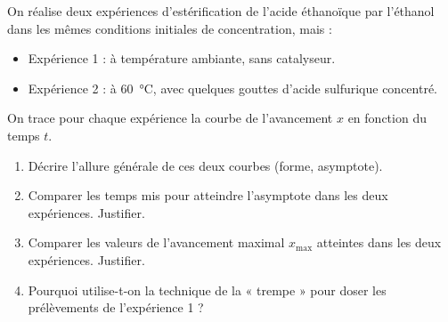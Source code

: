\documentclass[11pt]{article}
\begin{document}
\begin{exercice}
On réalise deux expériences d'estérification de l'acide éthanoïque par l'éthanol dans les mêmes conditions initiales de concentration, mais :
\begin{itemize}
    \item Expérience 1 : à température ambiante, sans catalyseur.
    \item Expérience 2 : à \SI{60}{\celsius}, avec quelques gouttes d'acide sulfurique concentré.
\end{itemize}
On trace pour chaque expérience la courbe de l'avancement $x$ en fonction du temps $t$.

\begin{enumerate}
    \item Décrire l'allure générale de ces deux courbes (forme, asymptote).
    \item Comparer les temps mis pour atteindre l'asymptote dans les deux expériences. Justifier.
    \item Comparer les valeurs de l'avancement maximal $x_{\text{max}}$ atteintes dans les deux expériences. Justifier.
    \item Pourquoi utilise-t-on la technique de la « trempe » pour doser les prélèvements de l'expérience 1 ?
\end{enumerate}
\end{exercice}
\end{document}

